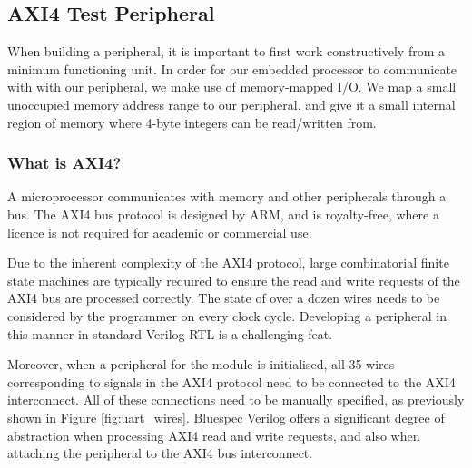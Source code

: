 \documentclass[a4paper,8pt]{report}
\begin{document}

\subsection{AXI4 Test Peripheral}
When building a peripheral, it is important to first work constructively from a
minimum functioning unit. In order for our embedded processor to communicate
with with our peripheral, we make use of memory-mapped I/O. We map a small
unoccupied memory address range to our peripheral, and give it a small internal
region of memory where 4-byte integers can be read/written from.

\subsubsection{What is AXI4?}
A microprocessor communicates with memory and other peripherals through a bus.
The AXI4 bus protocol is designed by ARM, and is royalty-free, where a licence
is not required for academic or commercial use.




Due to the inherent complexity of the AXI4 protocol, large combinatorial finite
state machines are typically required to ensure the read and write requests of
the AXI4 bus are processed correctly.
The state of over a dozen wires needs to be considered by the programmer on
every clock cycle. Developing a peripheral in this manner in standard Verilog
RTL is a challenging feat.

Moreover, when a peripheral for the module is initialised, all 35 wires
corresponding to signals in the AXI4 protocol need to be connected to the AXI4
interconnect. All of these connections need to be manually specified, as
previously shown in Figure \ref{fig:uart_wires}. Bluespec Verilog offers a
significant degree of abstraction when processing AXI4 read and write requests,
and also when attaching the peripheral to the AXI4 bus interconnect.
\end{document}
